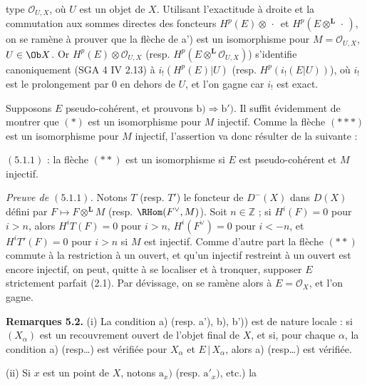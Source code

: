 type \(\mathcal O_{U,X}\), où \(U\) est un objet de \(X\). Utilisant l'exactitude à droite et la commutation aux sommes directes des foncteurs \(H^p(E)\otimes\,\cdot\,\) et \(H^p(E\otimes^{\mathbf L}\,\cdot\,)\), on se ramène à prouver que la flèche de a') est un isomorphisme pour \(M=\mathcal O_{U,X}\), \(U\in\Ob X\). Or \(H^p(E)\otimes\mathcal O_{U,X}\) (resp. \(H^p(E\otimes^{\mathbf L}\mathcal O_{U,X})\)) s'identifie canoniquement (SGA 4 IV 2.13) à \(i_!(H^p(E)|U)\) (resp. \(H^p(i_!(E|U))\)), où \(i_!\) est le prolongement par \(0\) en dehors de \(U\), et l'on gagne car \(i_!\) est exact.

Supposons \(E\) pseudo-cohérent, et prouvons \(\mathrm b)\Longrightarrow\mathrm b')\). Il suffit évidemment de montrer que \((*)\) est un isomorphisme pour \(M\) injectif. Comme la flèche \((***)\) est un isomorphisme pour \(M\) injectif, l'assertion va donc résulter de la suivante :

\((5.1.1)\) : la flèche \((**)\) est un isomorphisme si \(E\) est pseudo-cohérent et \(M\) injectif.

\emph{Preuve de \((5.1.1)\).} Notons \(T\) (resp. \(T'\)) le foncteur de \(D^-(X)\) dans \(D(X)\) défini par \(F\mapsto F\otimes^{\mathbf L}M\) (resp. \(\RHom(F^{\vee},M)\)). Soit \(n\in\mathbb Z\) ; si \(H^i(F)=0\) pour \(i>n\), alors \(H^iT(F)=0\) pour \(i>n\), \(H^i(F^{\vee})=0\) pour \(i<-n\), et \(H^iT'(F)=0\) pour \(i>n\) si \(M\) est injectif. Comme d'autre part la flèche \((**)\) commute à la restriction à un ouvert, et qu'un injectif restreint à un ouvert est encore injectif, on peut, quitte à se localiser et à tronquer, supposer \(E\) strictement parfait (2.1). Par dévissage, on se ramène alors à \(E=\mathcal O_X\), et l'on gagne.

\textbf{Remarques 5.2.} (i) La condition a) (resp. a'), b), b')) est de nature locale : si \((X_\alpha)\) est un recouvrement ouvert de l'objet final de \(X\), et si, pour chaque \(\alpha\), la condition a) (resp\ldots) est vérifiée pour \(X_\alpha\) et \(E\,|\,X_\alpha\), alors a) (resp\ldots) est vérifiée.

(ii) Si \(x\) est un point de \(X\), notons \(\mathrm a_x)\) (resp. \(\mathrm a'_x)\), etc.) la

